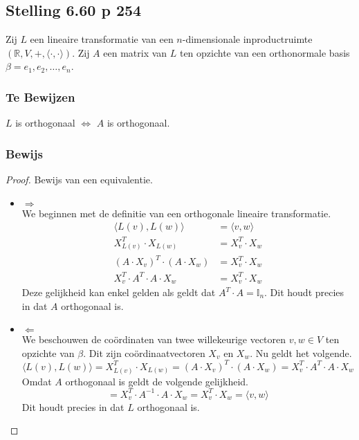\documentclass[lineaire_algebra_oplossingen.tex]{subfiles}
\begin{document}
\subsection{Stelling 6.60 p 254}
\label{6.60}
Zij $L$ een lineaire transformatie van een $n$-dimensionale inproductruimte $(\mathbb{R},V,+,\langle \cdot,\cdot \rangle)$.
Zij $A$ een matrix van $L$ ten opzichte van een orthonormale basis $\beta = e_1,e_2,\ldots,e_n$.

\subsubsection*{Te Bewijzen}
\begin{center}
$L$ is orthogonaal $\Leftrightarrow$ $A$ is orthogonaal.
\end{center}

\subsubsection*{Bewijs}
\begin{proof}
Bewijs van een equivalentie.
\begin{itemize}
\item $\Rightarrow$\\
We beginnen met de definitie van een orthogonale lineaire transformatie.
\begin{align*}
\langle L(v),L(w) \rangle &= \langle v,w \rangle \\
X_{L(v)}^T \cdot X_{L(w)} &= X_v^T \cdot X_w \\
(A\cdot X_{v})^T \cdot (A\cdot X_{w}) &= X_v^T \cdot X_w \\
X_v^{T}\cdot A^T \cdot A \cdot X_{w} &= X_v^T \cdot X_w 
\end{align*}
Deze gelijkheid kan enkel gelden als geldt dat $A^T \cdot A = \mathbb{I}_n$.
Dit houdt precies in dat $A$ orthogonaal is.

\item $\Leftarrow$\\
We beschouwen de co\"ordinaten van twee willekeurige vectoren $v,w \in V$ ten opzichte van $\beta$.
Dit zijn co\"ordinaatvectoren $X_v$ en $X_w$.
Nu geldt het volgende.
\[
\langle L(v),L(w) \rangle = X_{L(v)}^T \cdot X_{L(w)} = (A\cdot X_{v})^T \cdot (A\cdot X_{w}) = X_v^{T}\cdot A^T \cdot A \cdot X_{w}
\]
Omdat $A$ orthogonaal is geldt de volgende gelijkheid.
\[
 = X_v^{T}\cdot A^{-1} \cdot A \cdot X_{w} = X_v^T \cdot X_w  = \langle v,w \rangle
\]
Dit houdt precies in dat $L$ orthogonaal is.
\end{itemize}
\end{proof}
\end{document}
